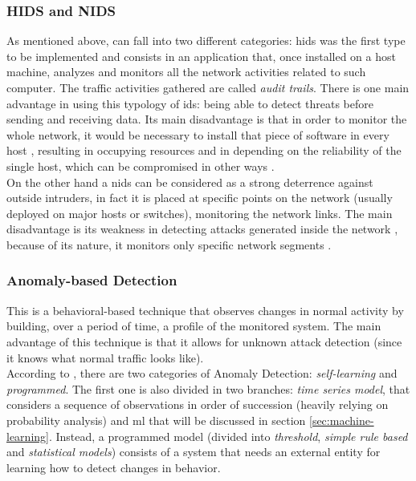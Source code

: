 
\subsubsection{HIDS and NIDS}
\label{subsubsec:hids-nids}

As mentioned above,  can fall into two different categories: \gls{hids} was the first type to be implemented \cite{Debar1999} and consists in an application that, once installed on a host machine, analyzes and monitors all the network activities related to such computer. The traffic activities gathered are called \textit{audit trails}. There is one main advantage in using this typology of \gls{ids}: being able to detect threats before sending and receiving data. Its main disadvantage is that in order to monitor the whole network, it would be necessary to install that piece of software in every host \cite{Hodo2017}, resulting in occupying resources and in depending on the reliability of the single host, which can be compromised in other ways \cite{Liu2019}. \\ On the other hand a \gls{nids} can be considered as a strong deterrence against outside intruders, in fact it is placed at specific points on the network (usually deployed on major hosts or switches), monitoring the network links. The main disadvantage is its weakness in detecting attacks generated inside the network \cite{Hodo2017}, because of its nature, it monitors only specific network segments \cite{Liu2019}.


\subsubsection{Anomaly-based Detection}
\label{subsubsec:anomaly-detection}

This is a behavioral-based technique that observes changes in normal activity by building, over a period of time, a profile of the monitored system. The main advantage of this technique is that it allows for unknown attack detection (since it knows what normal traffic looks like). \\ According to \cite{Hodo2017}, there are two categories of Anomaly Detection: \textit{self-learning} and \textit{programmed}. The first one is also divided in two branches: \textit{time series model}, that considers a sequence of observations in order of succession (heavily relying on probability analysis) and \gls{ml} that will be discussed in section \ref{sec:machine-learning}. Instead, a programmed model (divided into \textit{threshold}, \textit{simple rule based} and \textit{statistical models}) consists of a system that needs an external entity for learning how to detect changes in behavior.

